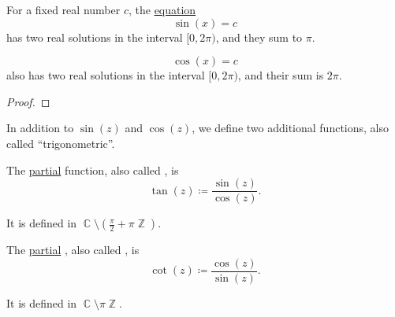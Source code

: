 \begin{corollary}\label{thm:trigonometric_angle_equations}
  For a fixed real number \( c \), the \hyperref[def:equation]{equation}
  \begin{equation}\label{eq:thm:trigonometric_angle_equations/sin}
    \sin(x) = c
  \end{equation}
  has two real solutions in the interval \( [0, 2\pi) \), and they sum to \( \pi \).

  \begin{equation}\label{eq:thm:trigonometric_angle_equations/cos}
    \cos(x) = c
  \end{equation}
  also has two real solutions in the interval \( [0, 2\pi) \), and their sum is \( 2\pi \).
\end{corollary}
\begin{proof}
\end{proof}

\begin{definition}\label{def:derived_trigonometric_functions}
  In addition to \( \sin(z) \) and \( \cos(z) \), we define two additional functions, also called \enquote{trigonometric}.

  \begin{thmenum}
     The \hyperref[def:set_valued_map/partial]{partial}  function, also called , is
    \begin{equation*}
      \tan(z) \coloneqq \frac {\sin(z)} {\cos(z)}.
    \end{equation*}

    It is defined in \( \BbbC \setminus (\tfrac \pi 2 + \pi\BbbZ) \).

     The \hyperref[def:set_valued_map/partial]{partial} , also called , is
    \begin{equation*}
      \cot(z) \coloneqq \frac {\cos(z)} {\sin(z)}.
    \end{equation*}

    It is defined in \( \BbbC \setminus \pi\BbbZ \).
  \end{thmenum}
\end{definition}

